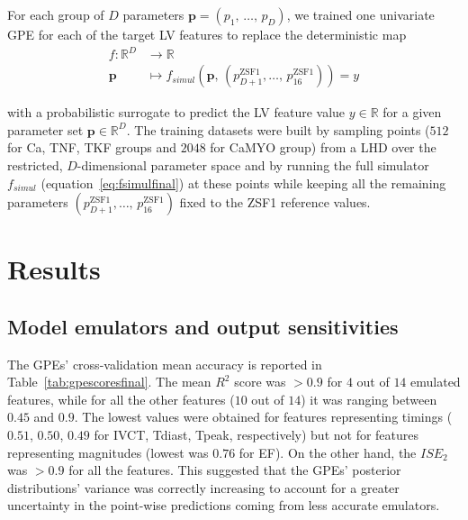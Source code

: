 \vspace{0.2cm}
For each group of $D$ parameters $\mathbf{p}=(p_1,\,\dots,\,p_D)$, we trained one univariate GPE for each of the target LV features to replace the deterministic map
%
\begin{align}
    f\colon\mathbb{R}^D &\to \mathbb{R} \\
    \mathbf{p} &\mapsto f_{simul}(\mathbf{p},\,(p_{D+1}^{\textrm{ZSF1}},\dots,\,p_{16}^{\textrm{ZSF1}}))=y
\end{align}

\vspace{0.2cm}\noindent
with a probabilistic surrogate to predict the LV feature value $y\in\mathbb{R}$ for a given parameter set $\mathbf{p}\in\mathbb{R}^D$. The training datasets were built by sampling points ($512$ for Ca, TNF, TKF groups and $2048$ for CaMYO group) from a LHD over the restricted, $D$-dimensional parameter space and by running the full simulator $f_{simul}$ (equation~\eqref{eq:fsimulfinal}) at these points while keeping all the remaining parameters $(p_{D+1}^{\textrm{ZSF1}},\dots,\,p_{16}^{\textrm{ZSF1}})$ fixed to the ZSF1 reference values. 


%
%
%
\section{Results}\label{sec:ch7results}


%
%
%
\subsection{Model emulators and output sensitivities}\label{sec:ch7modelemulatorsandoutputsensitivities}
The GPEs' cross-validation mean accuracy is reported in Table~\ref{tab:gpescoresfinal}. The mean $R^2$ score was $>0.9$ for $4$ out of $14$ emulated features, while for all the other features ($10$ out of $14$) it was ranging between $0.45$ and $0.9$. The lowest values were obtained for features representing timings ($0.51$, $0.50$, $0.49$ for IVCT, Tdiast, Tpeak, respectively) but not for features representing magnitudes (lowest was $0.76$ for EF). On the other hand, the $ISE_{2}$ was $>0.9$ for all the features. This suggested that the GPEs' posterior distributions' variance was correctly increasing to account for a greater uncertainty in the point-wise predictions coming from less accurate emulators.

